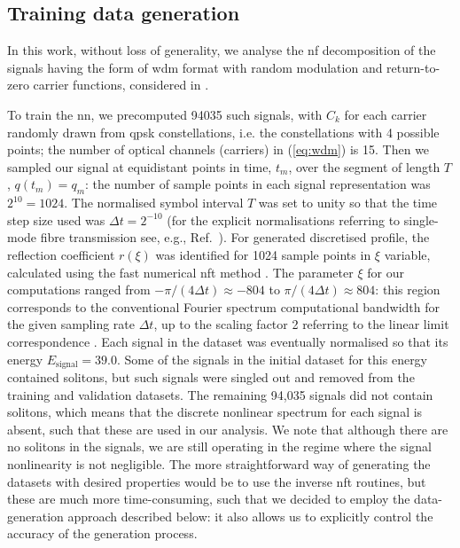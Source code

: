 \subsection{Training data generation}

In this work, without loss of generality, we analyse the \acrshort{nf} decomposition of the signals having the form of \acrfull{wdm} format with random modulation and return-to-zero carrier functions, considered in \cite{sedov2018,tsr19}. 

To train the \acrshort{nn}, we precomputed 94035 such signals, with $C_k$ for each carrier randomly drawn from \acrfull{qpsk} constellations, i.e. the constellations with 4 possible points; the number of optical channels (carriers) in (\ref{eq:wdm}) is 15. Then we sampled our signal at equidistant points in time, $t_m$, over the segment of length $T$, $q(t_m)=q_m$: the number of sample points in each signal representation was $2^{10}= 1024$. The normalised symbol interval $T$ was set to unity so that the time step size used was $\Delta t = 2^{-10}$ (for the explicit normalisations referring to single-mode fibre transmission see, e.g., Ref.~\cite{turitsyn2017nonlinear}).
For generated discretised profile, the reflection coefficient $r(\xi)$ was identified for 1024 sample points in $\xi$ variable,  calculated using the fast numerical \acrshort{nft} method \cite{FNFT2018}. The  parameter $\xi$ for our computations ranged from $-\pi / (4 \Delta t) \approx -804$ to $\pi / (4 \Delta t) \approx 804$: this region corresponds to the conventional Fourier spectrum computational bandwidth for the given sampling rate $\Delta t$, up to the scaling factor 2 referring to the linear limit correspondence \cite{pdt13}.
Each signal in the dataset was eventually normalised so that its energy $E_{\text{signal}} = 39.0$. 
Some of the signals in the initial dataset for this energy contained solitons, but such signals were singled out and removed from the training and validation datasets. 
The remaining 94,035 signals did not contain solitons, which means that the discrete nonlinear spectrum for each signal is absent, such that these are used in our analysis.
We note that although there are no solitons in the signals, we are still operating in the regime where the signal nonlinearity is not negligible. The more straightforward way of generating the datasets with desired properties would be to use the inverse \acrshort{nft} routines, but these are much more time-consuming, such that we decided to employ the data-generation approach described below: it also allows us to explicitly control the accuracy of the generation process. 



